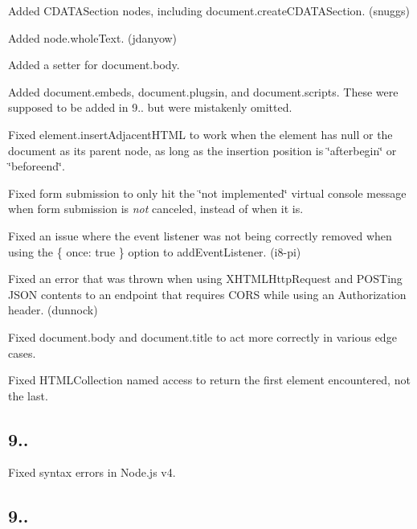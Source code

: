 \begin{DoxyItemize}
\item Added {\ttfamily C\+D\+A\+T\+A\+Section} nodes, including {\ttfamily document.\+create\+C\+D\+A\+T\+A\+Section}. (snuggs)
\item Added {\ttfamily node.\+whole\+Text}. (jdanyow)
\item Added a setter for {\ttfamily document.\+body}.
\item Added {\ttfamily document.\+embeds}, {\ttfamily document.\+plugsin}, and {\ttfamily document.\+scripts}. These were supposed to be added in 9.. but were mistakenly omitted.
\item Fixed {\ttfamily element.\+insert\+Adjacent\+H\+T\+ML} to work when the element has null or the document as its parent node, as long as the insertion position is {\ttfamily \char`\"{}afterbegin\char`\"{}} or {\ttfamily \char`\"{}beforeend\char`\"{}}.
\item Fixed form submission to only hit the \char`\"{}not implemented\char`\"{} virtual console message when form submission is {\itshape not} canceled, instead of when it is.
\item Fixed an issue where the event listener was not being correctly removed when using the {\ttfamily \{ once\+: true \}} option to {\ttfamily add\+Event\+Listener}. (i8-\/pi)
\item Fixed an error that was thrown when using {\ttfamily X\+H\+T\+M\+L\+Http\+Request} and P\+O\+S\+Ting J\+S\+ON contents to an endpoint that requires C\+O\+RS while using an {\ttfamily Authorization} header. (dunnock)
\item Fixed {\ttfamily document.\+body} and {\ttfamily document.\+title} to act more correctly in various edge cases.
\item Fixed {\ttfamily H\+T\+M\+L\+Collection} named access to return the first element encountered, not the last.
\end{DoxyItemize}

\subsection*{9..}


\begin{DoxyItemize}
\item Fixed syntax errors in Node.\+js v4.
\end{DoxyItemize}

\subsection*{9..}


